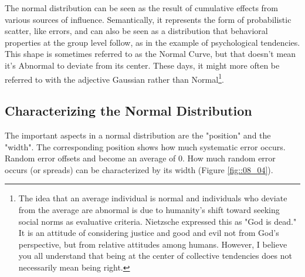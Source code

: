 \documentclass{ltjbook}
\begin{document}
The normal distribution can be seen as the result of cumulative effects from various sources of influence. Semantically, it represents the form of probabilistic scatter, like errors, and can also be seen as a distribution that behavioral properties at the group level follow, as in the example of psychological tendencies. This shape is sometimes referred to as the Normal Curve, but that doesn't mean it's Abnormal to deviate from its center. These days, it might more often be referred to with the adjective Gaussian rather than Normal\footnote{The idea that an average individual is normal and individuals who deviate from the average are abnormal is due to humanity's shift toward seeking social norms as evaluative criteria. Nietzsche expressed this as "God is dead." It is an attitude of considering justice and good and evil not from God's perspective, but from relative attitudes among humans. However, I believe you all understand that being at the center of collective tendencies does not necessarily mean being right.}.

\subsection{Characterizing the Normal Distribution}

The important aspects in a normal distribution are the "position" and the "width".
The corresponding position shows how much systematic error occurs. Random error offsets and become an average of 0. How much random error occurs (or spreads) can be characterized by its width (Figure \ref{fig::08_04}).
\end{document}
